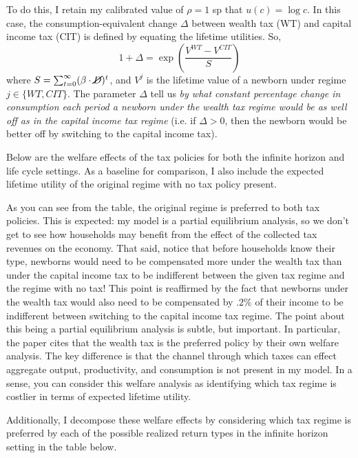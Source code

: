 \par To do this, I retain my calibrated value of $\rho =1$ sp that $u(c) = \log c$. In this case, the consumption-equivalent change $\Delta$ between wealth tax (WT) and capital income tax (CIT) is defined by equating the lifetime utilities. So, $$ 1 + \Delta = \exp( \frac{V^{WT} - V^{CIT}}{S}  )  $$ where $S = \sum_{t=0}^{\infty} (\beta \cdot \cancel{D})^{t}$, and $V^{j}$ is the lifetime value of a newborn under regime $j \in \{WT, CIT\}$. The parameter $\Delta$ tell us \textit{by what constant percentage change in consumption each period a newborn under the wealth tax regime would be as well off as in the capital income tax regime} (i.e. if $\Delta > 0$, then the newborn would be better off by switching to the capital income tax). 
 
\par Below are the welfare effects of the tax policies for both the infinite horizon and life cycle settings. As a baseline for comparison, I also include the expected lifetime utility of the original regime with no tax policy present. 



\par As you can see from the table, the original regime is preferred to both tax policies. This is expected: my model is a partial equilibrium analysis, so we don't get to see how households may benefit from the effect of the collected tax revenues on the economy. That said, notice that before households know their type, newborns would need to be compensated more under the wealth tax than under the capital income tax to be indifferent between the given tax regime and the regime with no tax! This point is reaffirmed by the fact that newborns under the wealth tax would also need to be compensated by $.2\%$ of their income to be indifferent between switching to the capital income tax regime. The point about this being a partial equilibrium analysis is subtle, but important. In particular, the \cite{Guvenen2023} paper cites that the wealth tax is the preferred policy by their own welfare analysis. The key difference is that the channel through which taxes can effect aggregate output, productivity, and consumption is not present in my model. In a sense, you can consider this welfare analysis as identifying which tax regime is costlier in terms of expected lifetime utility.

\par Additionally, I decompose these welfare effects by considering which tax regime is preferred by each of the possible realized return types in the infinite horizon setting in the table below. 

